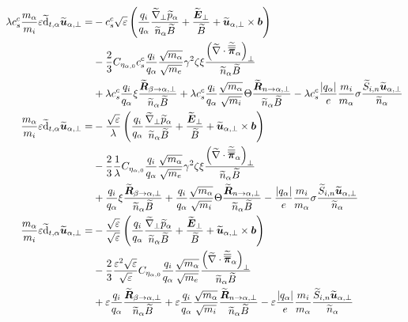 \begin{align*}
    \lambda c^c_s \frac{m_\a}{m_i} \e \wt{\d}_{t,\a}\wt{\ve{u}}_{\a,\perp}
 =&
 - c^c_s \sqrt{\e} \L( \frac{q_i}{q_\a} \frac{ \wt{\grad}_\perp \wt{p}_\a }{\wt{n}_\a \wt{B}} + \frac{\wt{\ve{E}}_\perp}{\wt{B}} + \wt{\ve{u}}_{\a,\perp}\times\ve{b} \R)
 \\&
 - \frac{2}{3} C_{\eta_{\a,0}} c^c_s \frac{q_i}{q_\a} \frac{\sqrt{m_\a}}{\sqrt{m_e}} \gamma^2 \zeta \xi \frac{ \L(\wt{\grad}\cdot\wt{\te{\pi}}_\a\R)_\perp }{\wt{n}_\a \wt{B}}
 \\&
 + \lambda c^c_s \frac{q_i}{q_\a} \xi \frac{\wt{\ve{R}}_{\beta \to \a,\perp} }{\wt{n}_\a \wt{B}}
 + \lambda c^c_s\frac{q_i}{q_\a} \frac{\sqrt{m_\a}}{\sqrt{m_i}} \Theta \frac{\wt{\ve{R}}_{n \to \a,\perp} }{\wt{n}_\a  \wt{B}}
 - \lambda c^c_s \frac{|q_\a|}{e} \frac{m_i}{m_\a} \sigma \frac{ \wt{S}_{i,n}\wt{\ve{u}}_{\a,\perp} }{\wt{n}_\a}
 \\
 \frac{m_\a}{m_i} \e \wt{\d}_{t,\a}\wt{\ve{u}}_{\a,\perp}
 =&
 - \frac{\sqrt{\e}}{\lambda} \L( \frac{q_i}{q_\a} \frac{ \wt{\grad}_\perp \wt{p}_\a }{\wt{n}_\a \wt{B}} + \frac{\wt{\ve{E}}_\perp}{\wt{B}} + \wt{\ve{u}}_{\a,\perp}\times\ve{b} \R)
 \\&
 - \frac{2}{3} \frac{1}{\lambda} C_{\eta_{\a,0}} \frac{q_i}{q_\a} \frac{\sqrt{m_\a}}{\sqrt{m_e}} \gamma^2 \zeta \xi \frac{ \L(\wt{\grad}\cdot\wt{\te{\pi}}_\a\R)_\perp }{\wt{n}_\a \wt{B}}
 \\&
 + \frac{q_i}{q_\a} \xi \frac{\wt{\ve{R}}_{\beta \to \a,\perp} }{\wt{n}_\a \wt{B}}
 + \frac{q_i}{q_\a} \frac{\sqrt{m_\a}}{\sqrt{m_i}} \Theta \frac{\wt{\ve{R}}_{n \to \a,\perp} }{\wt{n}_\a  \wt{B}}
 - \frac{|q_\a|}{e} \frac{m_i}{m_\a} \sigma \frac{ \wt{S}_{i,n}\wt{\ve{u}}_{\a,\perp} }{\wt{n}_\a}
 \\
 \frac{m_\a}{m_i} \e \wt{\d}_{t,\a}\wt{\ve{u}}_{\a,\perp}
 =&
 - \frac{\sqrt{\e}}{\sqrt{\e}} \L( \frac{q_i}{q_\a} \frac{ \wt{\grad}_\perp \wt{p}_\a }{\wt{n}_\a \wt{B}} + \frac{\wt{\ve{E}}_\perp}{\wt{B}} + \wt{\ve{u}}_{\a,\perp}\times\ve{b} \R)
 \\&
 - \frac{2}{3} \frac{\e^2 \sqrt{\e}}{\sqrt{\e}} C_{\eta_{\a,0}} \frac{q_i}{q_\a} \frac{\sqrt{m_\a}}{\sqrt{m_e}} \frac{ \L(\wt{\grad}\cdot\wt{\te{\pi}}_\a\R)_\perp }{\wt{n}_\a \wt{B}}
 \\&
 +\e \frac{q_i}{q_\a} \frac{\wt{\ve{R}}_{\beta \to \a,\perp} }{\wt{n}_\a \wt{B}}
 +\e \frac{q_i}{q_\a} \frac{\sqrt{m_\a}}{\sqrt{m_i}}  \frac{\wt{\ve{R}}_{n \to \a,\perp} }{\wt{n}_\a  \wt{B}}
 -\e \frac{|q_\a|}{e} \frac{m_i}{m_\a} \frac{ \wt{S}_{i,n}\wt{\ve{u}}_{\a,\perp} }{\wt{n}_\a}

\end{align*}
